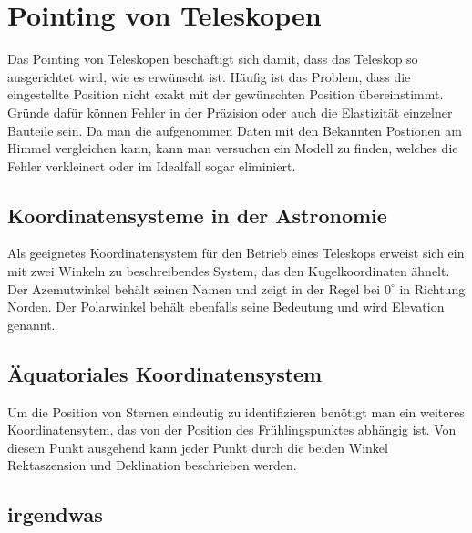 \chapter{Pointing von Teleskopen}
Das Pointing von Teleskopen beschäftigt sich damit, dass das Teleskop so ausgerichtet wird, wie es erwünscht ist. Häufig ist das Problem, dass die eingestellte Position nicht exakt mit der gewünschten Position übereinstimmt. Gründe dafür können Fehler in der Präzision oder auch die Elastizität einzelner Bauteile sein. Da man die aufgenommen Daten mit den Bekannten Postionen am Himmel vergleichen kann, kann man versuchen ein Modell zu finden, welches die Fehler verkleinert oder im Idealfall sogar eliminiert.

\section{Koordinatensysteme in der Astronomie}
Als geeignetes Koordinatensystem für den Betrieb eines Teleskops erweist sich ein mit zwei Winkeln zu beschreibendes System, das den Kugelkoordinaten ähnelt. Der Azemutwinkel behält seinen Namen und zeigt in der Regel bei $0^\circ$ in Richtung Norden. Der Polarwinkel behält ebenfalls seine Bedeutung und wird Elevation genannt.

\section{Äquatoriales Koordinatensystem}
Um die Position von Sternen eindeutig zu identifizieren benötigt man ein weiteres Koordinatensytem, das von der Position des Frühlingspunktes abhängig ist. Von diesem Punkt ausgehend kann jeder Punkt durch die beiden Winkel Rektaszension und Deklination beschrieben werden.

\section{irgendwas}
